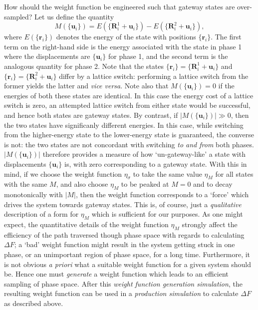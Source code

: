 \documentclass{report}
\begin{document}
How should the weight function be engineered such that gateway states are over-sampled? Let us define the quantity
\begin{equation}
M(\lbrace\mathbf{u}_i\rbrace)=E(\lbrace\mathbf{R}^{1}_i+\mathbf{u}_i\rbrace)
-E(\lbrace\mathbf{R}^{2}_i+\mathbf{u}_i\rbrace),
\end{equation}
where $E(\lbrace\mathbf{r}_i\rbrace)$ denotes the energy of the state with positions $\lbrace\mathbf{r}_i\rbrace$. The first term on the right-hand side
is the energy associated with the state in phase 1 where the displacements are $\lbrace\mathbf{u}_i\rbrace$ for phase 1, and the second term is the 
analogous quantity for phase 2. Note that the states $\lbrace\mathbf{r}_i\rbrace=\lbrace\mathbf{R}^{1}_i+\mathbf{u}_i\rbrace$ and 
$\lbrace\mathbf{r}_i\rbrace=\lbrace\mathbf{R}^{2}_i+\mathbf{u}_i\rbrace$ differ by a lattice switch: performing a lattice switch from the former yields 
the latter and \emph{vice versa}. Note also that $M(\lbrace\mathbf{u}_i\rbrace)=0$ if the energies of both these states are identical. In this
case the energy cost of a lattice switch is zero, an attempted lattice switch from either state would be successful, and hence both states are gateway 
states. By contrast, if $|M(\lbrace\mathbf{u}_i\rbrace)|\gg 0$, then the two states have significanly different energies. In this case, while
switching from the higher-energy state to the lower-energy state is guaranteed, the converse is not: the two states are not concordant with switching
\emph{to and from} both phases.
$|M(\lbrace\mathbf{u}_i\rbrace)|$ therefore provides a measure of how `un-gateway-like' a state with displacements $\lbrace\mathbf{u}_i\rbrace$ 
is, with zero corresponding to a gateway state. With this in mind, if we choose the weight function $\eta_{\sigma}$ to take the same value $\eta_{M}$ 
for all states with the same $M$, and also choose $\eta_{M}$ to be peaked at $M=0$ and to decay monotonically with 
$|M|$, then the weight function corresponds to a `force' which drives the system towards gateway states.
This is, of course, just a \emph{qualitative} description of a form for $\eta_{M}$ which is sufficient for our purposes. As one might expect, 
the quantitative details of the weight function $\eta_{M}$ strongly affect the efficiency of the path traversed though phase space with regards 
to calculating $\Delta F$; a `bad' weight function might result in the system getting stuck in one phase, or an unimportant region of phase space, for
a long time. Furthermore, it is not obvious \emph{a priori} what a suitable weight function for a given system should be. Hence one must 
\emph{generate} a weight function which leads to an efficient sampling of phase space. After this \emph{weight function generation simulation},
the resulting weight function can be used in a \emph{production simulation} to calculate $\Delta F$ as described above.
\end{document}
